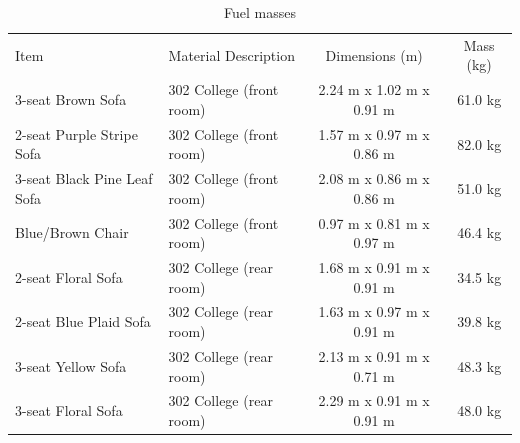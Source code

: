 \documentclass[12pt,oneside]{book}
\begin{document}
\begin{table}
\centering
\caption{Fuel masses}
\begin{tabular}{llcc}
\hline\noalign{\smallskip}
Item                         &  Material Description             &  Dimensions (m)            &  Mass (kg)  \\
\noalign{\smallskip}\hline\noalign{\smallskip}
3-seat Brown Sofa            &  302 College (front room)         &  2.24 m x 1.02 m x 0.91 m  &  61.0 kg    \\
2-seat Purple Stripe Sofa    &  302 College (front room)         &  1.57 m x 0.97 m x 0.86 m  &  82.0 kg    \\
3-seat Black Pine Leaf Sofa  &  302 College (front room)         &  2.08 m x 0.86 m x 0.86 m  &  51.0 kg    \\
Blue/Brown Chair             &  302 College (front room)         &  0.97 m x 0.81 m x 0.97 m  &  46.4 kg    \\
2-seat Floral Sofa           &  302 College (rear room)          &  1.68 m x 0.91 m x 0.91 m  &  34.5 kg    \\
2-seat Blue Plaid Sofa       &  302 College (rear room)          &  1.63 m x 0.97 m x 0.91 m  &  39.8 kg    \\
3-seat Yellow Sofa           &  302 College (rear room)          &  2.13 m x 0.91 m x 0.71 m  &  48.3 kg    \\
3-seat Floral Sofa           &  302 College (rear room)          &  2.29 m x 0.91 m x 0.91 m  &  48.0 kg    \\

\end{tabular}
\end{table}
\end{document}
